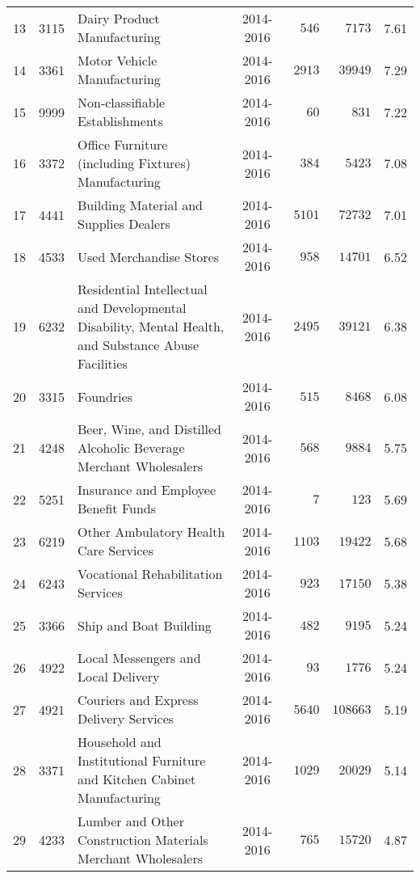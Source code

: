 \documentclass[9pt, oneside]{article}   	%
\begin{document}
\begin{longtable}{lcp{3in}cccc}
13  & 3115 & Dairy Product Manufacturing & 2014-2016 & $\phantom{00}546$ & $\phantom{00}7173$ &  7.61 \\
14  & 3361 & Motor Vehicle Manufacturing & 2014-2016 & $\phantom{0}2913$ & $\phantom{0}39949$ &  7.29 \\
15  & 9999 & Non-classifiable Establishments & 2014-2016 & $\phantom{000}60$ & $\phantom{000}831$ &  7.22 \\
16  & 3372 & Office Furniture (including Fixtures) Manufacturing & 2014-2016 & $\phantom{00}384$ & $\phantom{00}5423$ &  7.08 \\
17  & 4441 & Building Material and Supplies Dealers & 2014-2016 & $\phantom{0}5101$ & $\phantom{0}72732$ &  7.01 \\
18  & 4533 & Used Merchandise Stores & 2014-2016 & $\phantom{00}958$ & $\phantom{0}14701$ &  6.52 \\
19  & 6232 & Residential Intellectual and Developmental Disability, Mental Health, and Substance Abuse Facilities & 2014-2016 & $\phantom{0}2495$ & $\phantom{0}39121$ &  6.38 \\
20  & 3315 & Foundries & 2014-2016 & $\phantom{00}515$ & $\phantom{00}8468$ &  6.08 \\
21  & 4248 & Beer, Wine, and Distilled Alcoholic Beverage Merchant Wholesalers & 2014-2016 & $\phantom{00}568$ & $\phantom{00}9884$ &  5.75 \\
22  & 5251 & Insurance and Employee Benefit Funds & 2014-2016 & $\phantom{0000}7$ & $\phantom{000}123$ &  5.69 \\
23  & 6219 & Other Ambulatory Health Care Services & 2014-2016 & $\phantom{0}1103$ & $\phantom{0}19422$ &  5.68 \\
24  & 6243 & Vocational Rehabilitation Services & 2014-2016 & $\phantom{00}923$ & $\phantom{0}17150$ &  5.38 \\
25  & 3366 & Ship and Boat Building & 2014-2016 & $\phantom{00}482$ & $\phantom{00}9195$ &  5.24 \\
26  & 4922 & Local Messengers and Local Delivery & 2014-2016 & $\phantom{000}93$ & $\phantom{00}1776$ &  5.24 \\
27  & 4921 & Couriers and Express Delivery Services & 2014-2016 & $\phantom{0}5640$ & $108663$ &  5.19 \\
28  & 3371 & Household and Institutional Furniture and Kitchen Cabinet Manufacturing & 2014-2016 & $\phantom{0}1029$ & $\phantom{0}20029$ &  5.14 \\
29  & 4233 & Lumber and Other Construction Materials Merchant Wholesalers & 2014-2016 & $\phantom{00}765$ & $\phantom{0}15720$ &  4.87 \\

\end{longtable}
\end{document}
